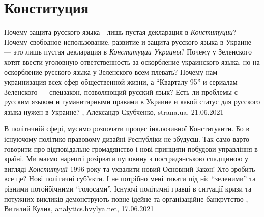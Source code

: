  
 
 
 
 
\chapter{Конституция}
\label{sec:slova.konstitucia}

Почему защита русского языка - лишь пустая декларация в \emph{Конституции}?
Почему свободное использование, развитие и защита русского языка в Украине —
это лишь пустая декларация в \emph{Конституции Украины}?  Почему у Зеленского
хотят ввести уголовную ответственность за оскорбление украинского языка, но на
оскорбление русского языка у Зеленского всем плевать?  Почему нам —
украинизация всех сфер общественной жизни, а \enquote{Кварталу 95} и сериалам
Зеленского — спецзакон, позволяющий русский язык?  Есть ли проблемы с русским
языком и гуманитарными правами в Украине и какой статус для русского языка
нужен в Украине?
, 
Александр Скубченко, strana.ua, 21.06.2021

В політичній сфері, мусимо розпочати процес інклюзивної Конституанти. Бо в
існуючому політико-правовому дизайні Республіки не збудуєш. Так само варто
говорити про відповідальне громадянство і нові принципи побудови управління в
країні. Ми маємо нарешті розірвати пуповину з пострадянською спадщиною у
вигляді \emph{Конституції} 1996 року та ухвалити новий Основний Закон!  Хто зробить
все це? Нові політичні суб'єкти.  І не потрібно мені тикати під ніс \enquote{зеленими}
та різними потойбічними \enquote{голосами}.
Існуючі політичні гравці в ситуації кризи та потужних викликів демонструють
повне ідейне та організаційне банкрутство
, 
Виталий Кулик, analytics.hvylya.net, 17.06.2021
